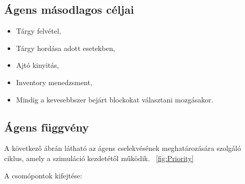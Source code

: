 \subsection{Ágens másodlagos céljai}

\begin{itemize}
    \item Tárgy felvétel,
    \item Tárgy hordása adott esetekben,
    \item Ajtó kinyitás,
    \item Inventory menedzsment,
    \item Mindig a kevesebbszer bejárt blockokat választani mozgásakor.
\end{itemize}

\subsection{Ágens függvény}

A következő ábrán látható az ágens cselekvésének meghatározására szolgáló ciklus, amely a szimuláció kezdetétől működik. ~\ref{fig:Priority}

\noindent A csomópontok kifejtése:

